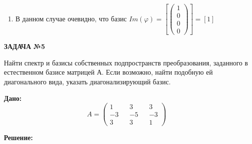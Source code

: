 \documentclass[a4paper]{article}
\begin{document}
\begin{enumerate}
		\item В данном случае очевидно, что базис $Im(\varphi) = [\begin{pmatrix} 1 \\ 0 \\ 0 \\ 0 \end{pmatrix}] = [1]$
	\end{enumerate}
	\begin{center}
		\textbf{ЗАДАЧА №5}
	\end{center}
	\par
	Найти спектр и базисы собственных подпространств преобразования, заданного в 
	естественном базисе матрицей А. Если возможно, найти подобную ей диагонального 
	вида, указать диагонализирующий базис.
	\par
	\textbf{Дано:}
	$$A=\begin{pmatrix} 1 && 3 && 3 \\ -3 && -5 && -3 \\ 3 && 3 && 1\end{pmatrix}$$
	\par
	\textbf{Решение:}
\end{document}
